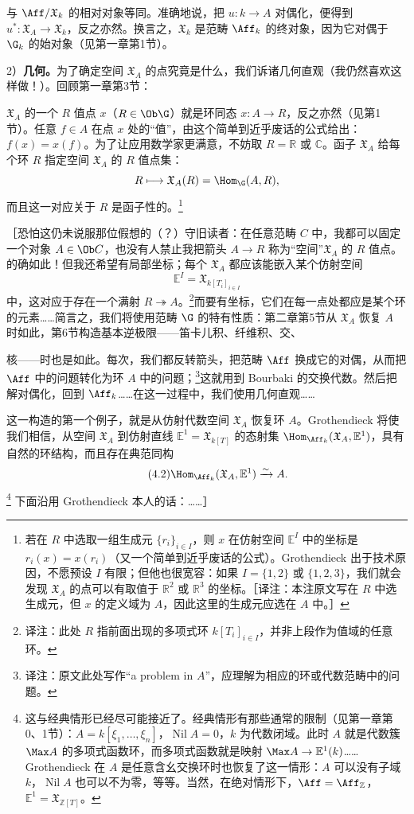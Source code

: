 与 $\Aff/\mathfrak X_k$ 的相对对象等同。准确地说，把 $u:k\to A$ 对偶化，便得到 $u^*:\mathfrak X_A\to\mathfrak X_k$，反之亦然。换言之，$\mathfrak X_k$ 是范畴 $\Aff_k$ 的终对象，因为它对偶于 $\G_k$ 的始对象（见第一章第1节）。

2）\textbf{几何。}为了确定空间 $\mathfrak X_A$ 的点究竟是什么，我们诉诸几何直观（我仍然喜欢这样做！）。回顾第一章第3节：

$\mathfrak X_A$ 的一个 $R$ 值点 $x$（$R\in\Ob\G$）就是环同态 $x:A\to R$，反之亦然（见第1节）。任意 $f\in A$ 在点 $x$ 处的“值”，由这个简单到近乎废话的公式给出：$f(x)=x(f)$。为了让应用数学家更满意，不妨取 $R=\mathbb R$ 或 $\mathbb C$。函子 $\mathfrak X_A$ 给每个环 $R$ 指定空间 $\mathfrak X_A$ 的 $R$ 值点集：
\[
 R\longmapsto\mathfrak X_A(R)=\Hom_{\G}(A,R),
\]
而且这一对应关于 $R$ 是函子性的。\footnote{若在 $R$ 中选取一组生成元 $\{r_i\}_{i\in I}$，则 $x$ 在仿射空间 $\mathbb E^I$ 中的坐标是 $r_i(x)=x(r_i)$（又一个简单到近乎废话的公式）。Grothendieck 出于技术原因，不愿预设 $I$ 有限；但他也很宽容：如果 $I=\{1,2\}$ 或 $\{1,2,3\}$，我们就会发现 $\mathfrak X_A$ 的点可以有取值于 $\mathbb R^2$ 或 $\mathbb R^3$ 的坐标。［译注：本注原文写在 $R$ 中选生成元，但 $x$ 的定义域为 $A$，因此这里的生成元应选在 $A$ 中。］}

［恐怕这仍未说服那位假想的（？）守旧读者：在任意范畴 $C$ 中，我都可以固定一个对象 $A\in\Ob C$，也没有人禁止我把箭头 $A\to R$ 称为“空间”$\mathfrak X_A$ 的 $R$ 值点。的确如此！但我还希望有局部坐标；每个 $\mathfrak X_A$ 都应该能嵌入某个仿射空间
\[
 \mathbb E^I=\mathfrak X_{k[T_i]_{i\in I}}
\]
中，这对应于存在一个满射 $R\twoheadrightarrow A$。\footnote{译注：此处 $R$ 指前面出现的多项式环 $k[T_i]_{i\in I}$，并非上段作为值域的任意环。}而要有坐标，它们在每一点处都应是某个环的元素……简言之，我们将使用范畴 $\G$ 的特有性质：第二章第5节从 $\mathfrak X_A$ 恢复 $A$ 时如此，第6节构造基本逆极限——笛卡儿积、纤维积、交、

核——时也是如此。每次，我们都反转箭头，把范畴 $\Aff$ 换成它的对偶，从而把 $\Aff$ 中的问题转化为环 $A$ 中的问题；\footnote{译注：原文此处写作“a problem in $A$”，应理解为相应的环或代数范畴中的问题。}这就用到 Bourbaki 的交换代数。然后把解对偶化，回到 $\Aff_k$……在这一过程中，我们使用几何直观……

这一构造的第一个例子，就是从仿射代数空间 $\mathfrak X_A$ 恢复环 $A$。Grothendieck 将使我们相信，从空间 $\mathfrak X_A$ 到仿射直线 $\mathbb E^1=\mathfrak X_{k[T]}$ 的态射集 $\Hom_{\Aff_k}(\mathfrak X_A,\mathbb E^1)$，具有自然的环结构，而且存在典范同构
\begin{equation}\tag{4.2}
 \Hom_{\Aff_k}(\mathfrak X_A,\mathbb E^1)\xrightarrow\sim A.
\end{equation}
\footnote{这与经典情形已经尽可能接近了。经典情形有那些通常的限制（见第一章第0、1节）：$A=k[\xi_1,\ldots,\xi_n]$，$\operatorname{Nil}A=0$，$k$ 为代数闭域。此时 $A$ 就是代数簇 $\Max A$ 的多项式函数环，而多项式函数就是映射 $\Max A\to\mathbb E^1(k)$……Grothendieck 在 $A$ 是任意含幺交换环时也恢复了这一情形：$A$ 可以没有子域 $k$，$\operatorname{Nil}A$ 也可以不为零，等等。当然，在绝对情形下，$\Aff=\Aff_{\mathbb Z}$，$\mathbb E^1=\mathfrak X_{\mathbb Z[T]}$。}
下面沿用 Grothendieck 本人的话：……］

